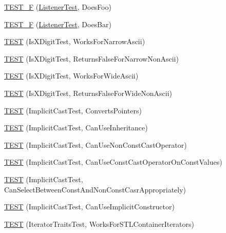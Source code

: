 \begin{DoxyCompactItemize}
\item 
\hyperlink{namespacetesting_1_1internal_a7e113e9c70d45d89fe1703e58ff083b9}{T\+E\+S\+T\+\_\+F} (\hyperlink{classtesting_1_1internal_1_1_listener_test}{Listener\+Test}, Does\+Foo)
\item 
\hyperlink{namespacetesting_1_1internal_a02cef32090020d164460dd3d9f8e2852}{T\+E\+S\+T\+\_\+F} (\hyperlink{classtesting_1_1internal_1_1_listener_test}{Listener\+Test}, Does\+Bar)
\item 
\hyperlink{namespacetesting_1_1internal_a0c1e055c001e4dbb874f00a46c25bb00}{T\+E\+ST} (Is\+X\+Digit\+Test, Works\+For\+Narrow\+Ascii)
\item 
\hyperlink{namespacetesting_1_1internal_a7cd9d67d4164d2aeb4ceb3ed253c7d2d}{T\+E\+ST} (Is\+X\+Digit\+Test, Returns\+False\+For\+Narrow\+Non\+Ascii)
\item 
\hyperlink{namespacetesting_1_1internal_af76bca685fddffc0ecda1464b1b6a0a4}{T\+E\+ST} (Is\+X\+Digit\+Test, Works\+For\+Wide\+Ascii)
\item 
\hyperlink{namespacetesting_1_1internal_a771232ed3801fa49cbd4bbe11b318fe3}{T\+E\+ST} (Is\+X\+Digit\+Test, Returns\+False\+For\+Wide\+Non\+Ascii)
\item 
\hyperlink{namespacetesting_1_1internal_a5d2ec1128c80363b06070f403f682490}{T\+E\+ST} (Implicit\+Cast\+Test, Converts\+Pointers)
\item 
\hyperlink{namespacetesting_1_1internal_a1b304dcd3ac71095f2e7d9e9b43c4755}{T\+E\+ST} (Implicit\+Cast\+Test, Can\+Use\+Inheritance)
\item 
\hyperlink{namespacetesting_1_1internal_a8554484c7c0ea536bc393c254490aaff}{T\+E\+ST} (Implicit\+Cast\+Test, Can\+Use\+Non\+Const\+Cast\+Operator)
\item 
\hyperlink{namespacetesting_1_1internal_af7f631f9fbde27b19a65d50fc29e1420}{T\+E\+ST} (Implicit\+Cast\+Test, Can\+Use\+Const\+Cast\+Operator\+On\+Const\+Values)
\item 
\hyperlink{namespacetesting_1_1internal_a62a3b62658f9d47733cb7b5c8f69b2ad}{T\+E\+ST} (Implicit\+Cast\+Test, Can\+Select\+Between\+Const\+And\+Non\+Const\+Casr\+Appropriately)
\item 
\hyperlink{namespacetesting_1_1internal_ad5c2cf37cc5aa78744012255cae78f9b}{T\+E\+ST} (Implicit\+Cast\+Test, Can\+Use\+Implicit\+Constructor)
\item 
\hyperlink{namespacetesting_1_1internal_abd56ca990c5b8c1aea44d15028a74f33}{T\+E\+ST} (Iterator\+Traits\+Test, Works\+For\+S\+T\+L\+Container\+Iterators)
\item 

\end{DoxyCompactItemize}
